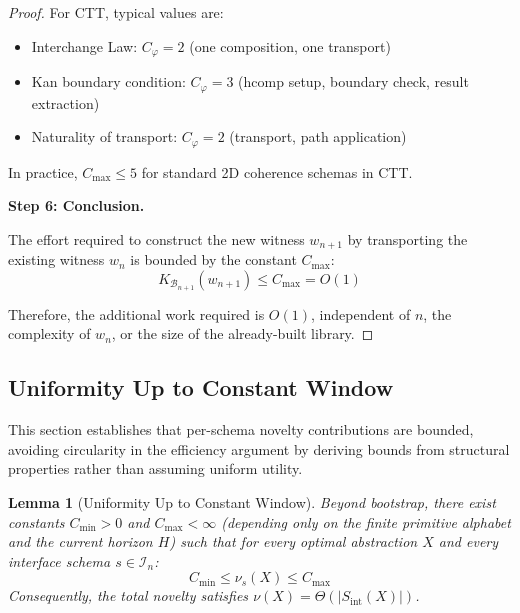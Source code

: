\documentclass[11pt]{article}
\newtheorem{lemma}[theorem]{Lemma}
\theoremstyle{definition}
\theoremstyle{remark}
\begin{document}
\begin{proof}
For CTT, typical values are:
\begin{itemize}
\item Interchange Law: $C_\varphi = 2$ (one composition, one transport)
\item Kan boundary condition: $C_\varphi = 3$ (hcomp setup, boundary check, result extraction)
\item Naturality of transport: $C_\varphi = 2$ (transport, path application)
\end{itemize}

In practice, $C_{\max} \leq 5$ for standard 2D coherence schemas in CTT.

\textbf{Step 6: Conclusion.}

The effort required to construct the new witness $w_{n+1}$ by transporting the existing witness $w_n$
is bounded by the constant $C_{\max}$:
\[
K_{\mathcal{B}_{n+1}}(w_{n+1}) \leq C_{\max} = O(1)
\]

Therefore, the additional work required is $O(1)$, independent of $n$, the complexity of $w_n$, or
the size of the already-built library.
\end{proof}

\subsection{Uniformity Up to Constant Window}
\label{app:uniformity}

This section establishes that per-schema novelty contributions are bounded, avoiding circularity
in the efficiency argument by deriving bounds from structural properties rather than assuming
uniform utility.

\begin{lemma}[Uniformity Up to Constant Window]
\label{lem:uniformity-full}
Beyond bootstrap, there exist constants $C_{\min} > 0$ and $C_{\max} < \infty$ (depending only on the
finite primitive alphabet and the current horizon $H$) such that for every optimal abstraction $X$
and every interface schema $s \in \mathcal{I}_n$:
\[
C_{\min} \leq \nu_s(X) \leq C_{\max}
\]
Consequently, the total novelty satisfies $\nu(X) = \Theta(|S_{\text{int}}(X)|)$.
\end{lemma}
\end{document}
